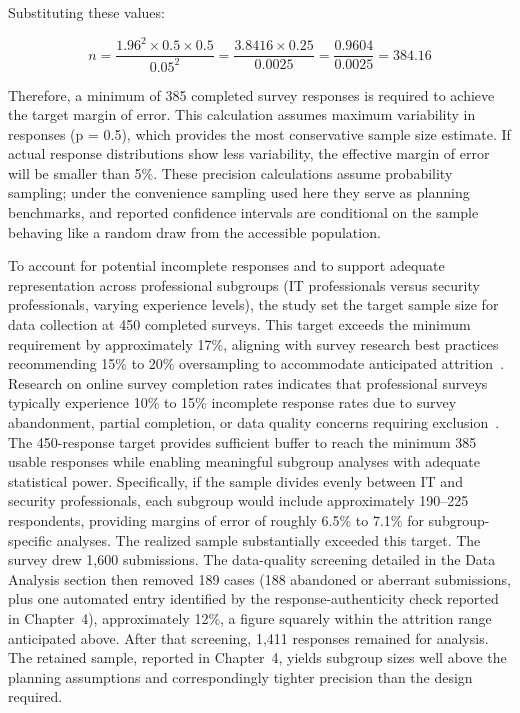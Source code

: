 Substituting these values:

\begin{equation}
  \label{eqn:ModelSizeCalc}
  n = \frac{1.96^2 \times 0.5 \times 0.5}{0.05^2} = \frac{3.8416 \times 0.25}{0.0025} = \frac{0.9604}{0.0025} = 384.16
\end{equation}

Therefore, a minimum of 385 completed survey responses is required to achieve the target margin of error. This calculation assumes maximum variability in responses (p = 0.5), which provides the most conservative sample size estimate. If actual response distributions show less variability, the effective margin of error will be smaller than 5\%. These precision calculations assume probability sampling; under the convenience sampling used here they serve as planning benchmarks, and reported confidence intervals are conditional on the sample behaving like a random draw from the accessible population.

To account for potential incomplete responses and to support adequate representation across professional subgroups (IT professionals versus security professionals, varying experience levels), the study set the target sample size for data collection at 450 completed surveys. This target exceeds the minimum requirement by approximately 17\%, aligning with survey research best practices recommending 15\% to 20\% oversampling to accommodate anticipated attrition~\parencite{Dillman_Smyth_Christian_2014}. Research on online survey completion rates indicates that professional surveys typically experience 10\% to 15\% incomplete response rates due to survey abandonment, partial completion, or data quality concerns requiring exclusion~\parencite{Fan_Yan_2010}. The 450-response target provides sufficient buffer to reach the minimum 385 usable responses while enabling meaningful subgroup analyses with adequate statistical power. Specifically, if the sample divides evenly between IT and security professionals, each subgroup would include approximately 190--225 respondents, providing margins of error of roughly 6.5\% to 7.1\% for subgroup-specific analyses. The realized sample substantially exceeded this target. The survey drew 1{,}600 submissions. The data-quality screening detailed in the Data Analysis section then removed 189 cases (188 abandoned or aberrant submissions, plus one automated entry identified by the response-authenticity check reported in Chapter~4), approximately 12\%, a figure squarely within the attrition range anticipated above. After that screening, 1{,}411 responses remained for analysis. The retained sample, reported in Chapter~4, yields subgroup sizes well above the planning assumptions and correspondingly tighter precision than the design required.

